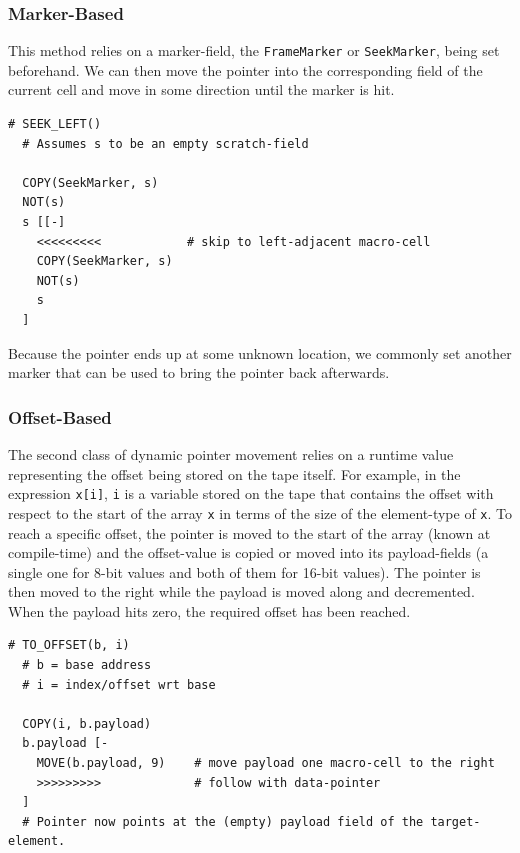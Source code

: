 \subsubsection{Marker-Based}
This method relies on a marker-field, the \texttt{FrameMarker} or \texttt{SeekMarker}, being set beforehand. We can then move the pointer into the corresponding field of the current cell and move in some direction until the marker is hit.

\vspace{0.5cm}\noindent\begin{minipage}{\linewidth}
\begin{lstlisting}[style=brainfuck]
  # SEEK_LEFT()
  # Assumes s to be an empty scratch-field

  COPY(SeekMarker, s)
  NOT(s)
  s [[-]
    <<<<<<<<<            # skip to left-adjacent macro-cell
    COPY(SeekMarker, s)
    NOT(s)
    s
  ]
\end{lstlisting}
\end{minipage}

Because the pointer ends up at some unknown location, we commonly set another marker that can be used to bring the pointer back afterwards.

\subsubsection{Offset-Based}
The second class of dynamic pointer movement relies on a runtime value representing the offset being stored on the tape itself. For example, in the expression \texttt{x[i]}, \texttt{i} is a variable stored on the tape that contains the offset with respect to the start of the array \texttt{x} in terms of the size of the element-type of \texttt{x}. To reach a specific offset, the pointer is moved to the start of the array (known at compile-time) and the offset-value is copied or moved into its payload-fields (a single one for 8-bit values and both of them for 16-bit values). The pointer is then moved to the right while the payload is moved along and decremented. When the payload hits zero, the required offset has been reached.

\vspace{0.5cm}\noindent\begin{minipage}{\linewidth}
\begin{lstlisting}[style=brainfuck]
  # TO_OFFSET(b, i)
  # b = base address
  # i = index/offset wrt base

  COPY(i, b.payload)
  b.payload [-
    MOVE(b.payload, 9)    # move payload one macro-cell to the right
    >>>>>>>>>             # follow with data-pointer
  ]
  # Pointer now points at the (empty) payload field of the target-element.
\end{lstlisting}
\end{minipage}

